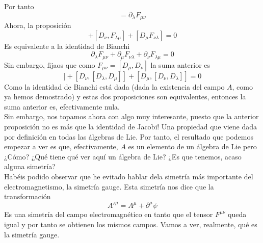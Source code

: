 \documentclass[12pt]{article}
\begin{document}
Por tanto
\begin{equation}
    [D_\lambda, F_{\mu\nu}]=\partial_\lambda F_{\mu \nu} 
\end{equation}
Ahora, la proposición 
\begin{equation*}
    [D_\lambda, F_{\mu\nu}] +[D_\nu, F_{\lambda\mu}] +[D_\mu F_{\nu\lambda}] = 0
\end{equation*}
Es equivalente a la identidad de Bianchi 
\begin{equation}
    \partial_\lambda F_{\mu \nu}+\partial_\mu F_{\nu \lambda}+ \partial_\nu F_{\lambda \mu}=0
\end{equation}
Sin embargo, fijaos que como $F_{\mu\nu}=[D_\mu, D_\nu]$ la suma anterior es 
\begin{equation*}
    [D_\lambda,[D_\mu,D_\nu]]+[D_\nu, [D_\lambda, D_\mu]]+ [D_\mu, [D_\nu, D_\lambda]]=0
\end{equation*}
Como la identidad de Bianchi está dada  (dada la existencia del campo $A$, como ya hemos demostrado) y estas dos proposiciones son equivalentes, entonces la suma anterior es, efectivamente nula. \\
Sin embargo, nos topamos ahora con algo muy interesante, puesto que la anterior proposición no es más que la identidad de Jacobi! Una propiedad que viene dada por definición en todas las álgebras de Lie. Por tanto, el resultado que podemos empezar a ver es que, efectivamente, $A$ es un elemento de un álgebra de Lie pero ¿Cómo? ¿Qué tiene qué ver aquí un álgebra de Lie? ¿Es que tenemos, acaso alguna simetría? \\
Habéis podido observar que he evitado hablar dela simetría más importante del electromagnetismo, la simetría gauge. Esta simetría nos dice que la transformación 
\begin{equation}
    A'^\mu =A^\mu +\partial^\mu \psi 
\end{equation}
Es una simetría del campo electromagnético en tanto que el tensor $F^{\mu \nu}$ queda igual y por tanto se obtienen los mismos campos. Vamos a ver, realmente, qué es la simetría gauge.\\
\end{document}
